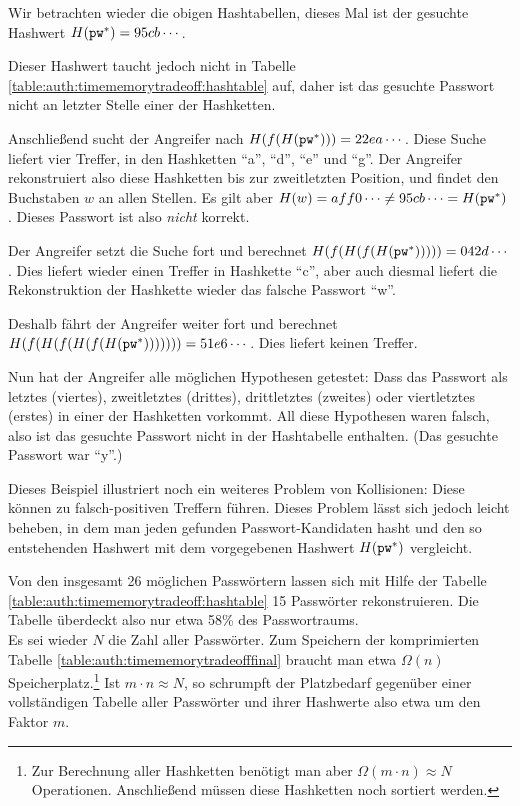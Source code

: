 \begin{beispiel}
	Wir betrachten wieder die obigen Hashtabellen, dieses Mal ist der gesuchte Hashwert $H(\texttt{pw}^*) = 95cb\cdots$.
	
	Dieser Hashwert taucht jedoch nicht in Tabelle \ref{table:auth:timememorytradeoff:hashtable} auf, daher ist das gesuchte Passwort nicht an letzter Stelle einer der Hashketten.
	
	Anschließend sucht der Angreifer nach $H(f(H(\texttt{pw}^*))) = 22ea\cdots$. Diese Suche liefert vier Treffer, in den Hashketten "`a"', "`d"', "`e"' und "`g"'. Der Angreifer rekonstruiert also diese Hashketten bis zur zweitletzten Position, und findet den Buchstaben $w$ an allen Stellen. Es gilt aber $H(w) = aff0\cdots \neq 95cb\cdots = H(\texttt{pw}^*)$. Dieses Passwort ist also \emph{nicht} korrekt.
	
	Der Angreifer setzt die Suche fort und berechnet $H(f(H(f(H(\texttt{pw}^*))))) = 042d\cdots$. Dies liefert wieder einen Treffer in Hashkette "`c"', aber auch diesmal liefert die Rekonstruktion der Hashkette wieder das falsche Passwort "`w"'.
	
	Deshalb fährt der Angreifer weiter fort und berechnet $H(f(H(f(H(f(H(\texttt{pw}^*))))))) = 51e6\cdots$. Dies liefert keinen Treffer.
	
	Nun hat der Angreifer alle möglichen Hypothesen getestet: Dass das Passwort als letztes (viertes), zweitletztes (drittes), drittletztes (zweites) oder viertletztes (erstes) in einer der Hashketten vorkommt.
	All diese Hypothesen waren falsch, also ist das gesuchte Passwort nicht in der Hashtabelle enthalten.
	(Das gesuchte Passwort war "`y"'.)\\
\end{beispiel}

Dieses Beispiel illustriert noch ein weiteres Problem von Kollisionen: Diese können zu falsch-positiven Treffern führen. Dieses Problem lässt sich jedoch leicht beheben, in dem man jeden gefunden Passwort-Kandidaten hasht und den so entstehenden Hashwert mit dem vorgegebenen Hashwert $H(\texttt{pw}^*)$ vergleicht.

Von den insgesamt 26 möglichen Passwörtern lassen sich mit Hilfe der Tabelle \ref{table:auth:timememorytradeoff:hashtable} 15 Passwörter rekonstruieren. Die Tabelle überdeckt also nur etwa 58\% des Passwortraums.\\

Es sei wieder $N$ die Zahl aller Passwörter. Zum Speichern der komprimierten Tabelle \ref{table:auth:timememorytradeofffinal} braucht man etwa $\Omega(n)$ Speicherplatz.\footnote{Zur Berechnung aller Hashketten benötigt man aber $\Omega(m \cdot n) \approx N$ Operationen. Anschließend müssen diese Hashketten noch sortiert werden.} Ist $m \cdot n \approx N$, so schrumpft der Platzbedarf gegenüber einer vollständigen Tabelle aller Passwörter und ihrer Hashwerte also etwa um den Faktor $m$.

